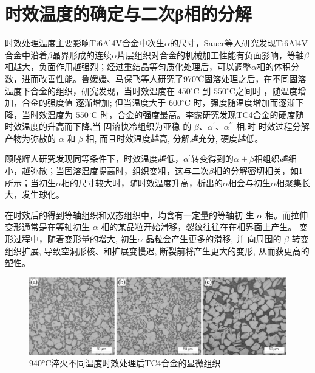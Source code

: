 \documentclass[
class = book,
zihao = -4,
font = noto,
paper = a4paper,
openany
]{easybook}
\newcommand{\ti}{Ti6Al4V}
\begin{document}
\section{时效温度的确定与二次β相的分解}
时效处理温度主要影响\ti 合金中次生$ \alpha $的尺寸，Sauer\cite{sauerThermomechanicalProcessingHigh2001}等人研究发现\ti 合金中沿着$ \beta $晶界形成的连续$ \alpha  $片层组织对合金的机械加工性能有负面影响，等轴$ \beta $相越大，负面作用越强烈；经过重结晶等匀质化处理后，可以调整$ \alpha $相的体积分数，进而改善性能。鲁媛媛、马保飞\cite{luyuanyuanShixiaochuliduiTC4taihejinweiguanzuzhihelixuexingnengdeyingxiang2019}等人研究了970℃固溶处理之后，在不同固溶温度下合金的组织，研究发现，当时效温度在 $450{ }^{\circ} \mathrm{C}$ 到 $550{ }^{\circ} \mathrm{C}$之间时 ，随温度增加，合金的强度值 逐渐增加; 但当温度大于 $600{ }^{\circ} \mathrm{C}$ 时，强度随温度增加而逐渐下降，当时效温度为 $550{ }^{\circ} \mathrm{C}$ 时，合金的强度最高。李露\cite{lilouGurongshixiaoduiTC4hejinzuzhiyujixiexingnengdeyingxiang2014}研究发现TC4合金的硬度随时效温度的升高而下降,当 固溶快冷组织为亚稳 的 $\beta 、 \alpha^{\prime} 、 \alpha^{\prime\prime}$ 相,时 时效过程分解产物为弥散的 $\alpha$ 和 $\beta$ 相, 而且时效温度越高, 分解越充分, 硬度越低。

顾晓辉\cite{guxiaohuiCuihuoShixiaowenduduiTC4taihejinzuzhihelixuexingnengdeyingxiang2011}人研究发现同等条件下，时效温度越低，$ \alpha^{\prime} $转变得到的$ \alpha+\beta  $相组织越细小，越弥散；当固溶温度提高时，组织变粗，这与二次$ \beta $相的分解密切相关，如\ref{fig:940ctc4} 所示；当初生$ \alpha $相的尺寸较大时，随时效温度升高，析出的$ \alpha $相会与初生$ \alpha $相聚集长大，发生球化。

在时效后的得到等轴组织和双态组织中，均含有一定量的等轴初 生 $\alpha$ 相。而拉伸变形通常是在等轴初生 $\alpha$ 相的某晶粒开始滑移，裂纹往往在在相界面上产生。 变形过程中，随着变形量的增大, 初生$\alpha$ 晶粒会产生更多的滑移, 并 向周围的 $\beta$ 转变组织扩展, 导致空洞形核、和扩展变慢迟, 断裂前将产生更大的变形, 从而获更高的塑性\cite{yekangyuanRechuliduiTC4taihejinduanjianzuzhihexingnengdeyingxiang2022}。

\begin{figure}[h!]
	\centering
	\includegraphics[width=0.7\linewidth]{940°C淬火不同温度时效处理后TC4合金的显微组织}
	\caption{940°C淬火不同温度时效处理后TC4合金的显微组织}
	\label{fig:940ctc4}
\end{figure}
\end{document}
